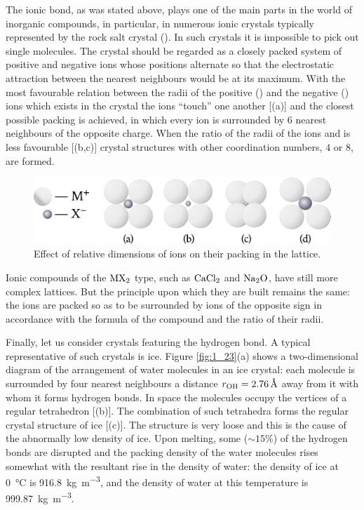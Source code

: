 The ionic bond, as was stated above, plays one of the main parts in the world of inorganic compounds, in particular, in numerous ionic crystals typically represented by the rock salt crystal  (). In such crystals it is impossible to pick out single molecules. The crystal should be regarded as a closely packed system of positive and negative ions whose positions alternate so that the electrostatic attraction between the nearest neighbours would be at its maximum. With the most favourable relation between the radii of the positive () and the negative () ions which exists in the  crystal the ions ``touch'' one another [(a)] and the closest possible packing is achieved, in which every ion is surrounded by $6$ nearest neighbours of the opposite charge. When the ratio of the radii of the ions  and is less favourable [(b,c)] crystal structures with other coordination numbers, $4$ or $8$, are formed.

\begin{figure}[t]
	\begin{center}
		\includegraphics[scale=1.1]{figures/ch_01/fig_1_22.pdf}
		\caption[]{Effect of relative dimensions of ions on their packing in the lattice.}
		\label{fig:1_22}
	\end{center}
	\vspace{-0.7cm}
\end{figure}

Ionic compounds of the $\ce{MX2}$ type, such as $\ce{CaCl2}$ and $\ce{Na2O}$, have still more complex lattices. But the principle upon which they are built remains the same: the ions are packed so as to be surrounded by ions of the opposite sign in accordance with the formula of the compound and the ratio of their radii.

Finally, let us consider crystals featuring the hydrogen bond. A typical representative of such crystals is ice. Figure \ref{fig:1_23}(a) shows a two-dimensional diagram of the arrangement of water molecules in an ice crystal: each molecule is surrounded by four nearest neighbours a distance $r_{\ce{OH}}=\SI{2.76}{\angstrom}$ away from it with whom it forms hydrogen bonds. In space the molecules occupy the vertices of a regular tetrahedron [(b)]. The combination of such tetrahedra forms the regular crystal structure of ice [(c)]. The structure is very loose and this is the cause of the abnormally low density of ice. Upon melting, some ($\sim 15\%$) of the hydrogen bonds are disrupted and the packing density of the water molecules rises somewhat with the resultant rise in the density of water: the density of ice at \SI{0}{\degreeCelsius} is \SI{916.8}{\kilo\gram\per\metre\cubed}, and the density of water at this temperature is \SI{999.87}{\kilo\gram\per\metre\cubed}.

